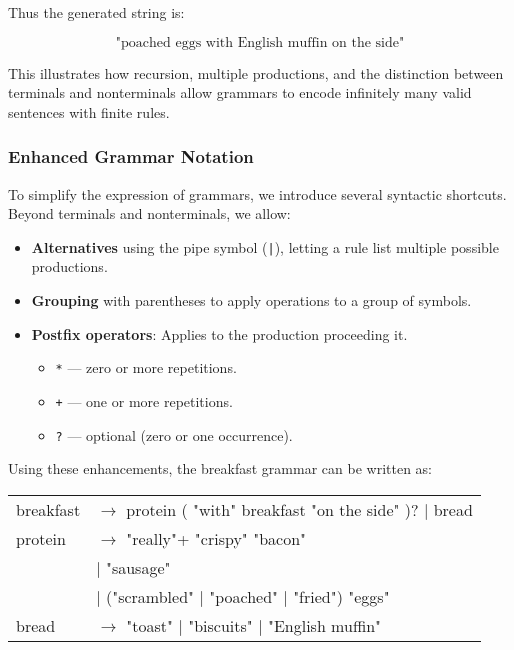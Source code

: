 \documentclass[12pt,a4paper]{article}
\newcommand{\newpar} {
  \vspace{1em}
  \noindent
}
\begin{document}
Thus the generated string is:

\[
	\text{"poached eggs with English muffin on the side"}
\]

\newpar
This illustrates how recursion, multiple productions, and the distinction between terminals and nonterminals allow grammars to encode infinitely many valid sentences with finite rules.

\subsubsection{Enhanced Grammar Notation}

To simplify the expression of grammars, we introduce several syntactic shortcuts. Beyond terminals and nonterminals, we allow:

\begin{itemize}
	\item \textbf{Alternatives} using the pipe symbol (\texttt{|}), letting a rule list multiple possible productions.
	\item \textbf{Grouping} with parentheses to apply operations to a group of symbols.
	\item \textbf{Postfix operators}: Applies to the production proceeding it.
	      \begin{itemize}
		      \item \texttt{*} --- zero or more repetitions.
		      \item \texttt{+} --- one or more repetitions.
		      \item \texttt{?} --- optional (zero or one occurrence).
	      \end{itemize}
\end{itemize}

\newpar
Using these enhancements, the breakfast grammar can be written as:

\newpar
\begin{tabular}{@{}l@{}l@{}}
	breakfast & $\rightarrow$ protein ( "with" breakfast "on the side" )? $|$ bread \\
	protein   & $\rightarrow$ "really"+ "crispy" "bacon"                            \\
	          & $|$ "sausage"                                                       \\
	          & $|$ ("scrambled" $|$ "poached" $|$ "fried") "eggs"                  \\
	bread     & $\rightarrow$ "toast" $|$ "biscuits" $|$ "English muffin"           \\
\end{tabular}
\end{document}
